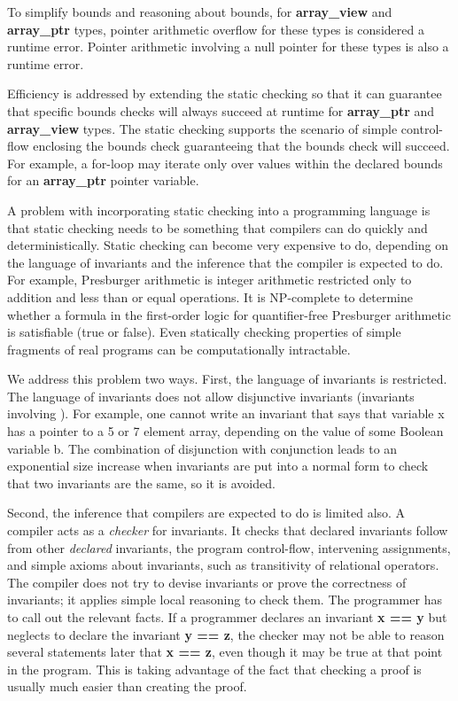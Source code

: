 \documentclass[]{article}
\begin{document}
To simplify bounds and reasoning about bounds, for \textbf{array\_view}
and \textbf{array\_ptr} types, pointer arithmetic overflow for these
types is considered a runtime error. Pointer arithmetic involving a null
pointer for these types is also a runtime error.

Efficiency is addressed by extending the static checking so that it can
guarantee that specific bounds checks will always succeed at runtime for
\textbf{array\_ptr} and \textbf{array\_view} types. The static checking
supports the scenario of simple control-flow enclosing the bounds check
guaranteeing that the bounds check will succeed. For example, a for-loop
may iterate only over values within the declared bounds for an
\textbf{array\_ptr} pointer variable.

A problem with incorporating static checking into a programming language
is that static checking needs to be something that compilers can do
quickly and deterministically. Static checking can become very expensive
to do, depending on the language of invariants and the inference that
the compiler is expected to do. For example, Presburger arithmetic is
integer arithmetic restricted only to addition and less than or equal
operations. It is NP-complete to determine whether a formula in the
first-order logic for quantifier-free Presburger arithmetic is
satisfiable (true or false). Even statically checking properties of
simple fragments of real programs can be computationally intractable.

We address this problem two ways. First, the language of invariants is
restricted. The language of invariants does not allow disjunctive
invariants (invariants involving \textbar{}\textbar{}). For example, one
cannot write an invariant that says that variable x has a pointer to a 5
or 7 element array, depending on the value of some Boolean variable b.
The combination of disjunction with conjunction leads to an exponential
size increase when invariants are put into a normal form to check that
two invariants are the same, so it is avoided.

Second, the inference that compilers are expected to do is limited also.
A compiler acts as a \emph{checker} for invariants. It checks that
declared invariants follow from other \emph{declared} invariants, the
program control-flow, intervening assignments, and simple axioms about
invariants, such as transitivity of relational operators. The compiler
does not try to devise invariants or prove the correctness of
invariants; it applies simple local reasoning to check them. The
programmer has to call out the relevant facts. If a programmer declares
an invariant \textbf{x == y} but neglects to declare the invariant
\textbf{y == z}, the checker may not be able to reason several
statements later that \textbf{x == z}, even though it may be true at
that point in the program. This is taking advantage of the fact that
checking a proof is usually much easier than creating the proof.
\end{document}
